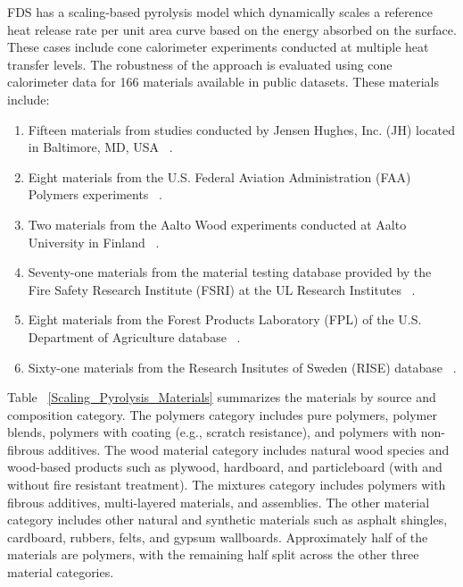 FDS has a scaling-based pyrolysis model which dynamically scales a reference heat release rate per unit area curve based on the energy absorbed on the surface.
These cases include cone calorimeter experiments conducted at multiple heat transfer levels.
The robustness of the approach is evaluated using cone calorimeter data for 166 materials available in public datasets.
These materials include:
\begin{enumerate}
\item Fifteen materials from studies conducted by Jensen Hughes, Inc. (JH) located in Baltimore, MD, USA ~\cite{Luo:FRA2019,Lattimer:NIJ19}.
\item Eight materials from the U.S. Federal Aviation Administration (FAA) Polymers experiments ~\cite{Stoliarov:CF2009,Stoliarov:FM2012}.
\item Two materials from the Aalto Wood experiments conducted at Aalto University in Finland ~\cite{Rinta-Paavola:2023}.
\item Seventy-one materials from the material testing database provided by the Fire Safety Research Institute (FSRI) at the UL Research Institutes ~\cite{McKinnon:FSRI2023_Data}.
\item Eight materials from the Forest Products Laboratory (FPL) of the U.S. Department of Agriculture database ~\cite{FPL:Fire_Database}.
\item Sixty-one materials from the Research Insitutes of Sweden (RISE) database ~\cite{RISE:Fire_Database}.
\end{enumerate}
Table ~\ref{Scaling_Pyrolysis_Materials} summarizes the materials by source and composition category.
The polymers category includes pure polymers, polymer blends, polymers with coating (e.g., scratch resistance), and polymers with non-fibrous additives.
The wood material category includes natural wood species and wood-based products such as plywood, hardboard, and particleboard (with and without fire resistant treatment).
The mixtures category includes polymers with fibrous additives, multi-layered materials, and assemblies.
The other material category includes other natural and synthetic materials such as asphalt shingles, cardboard, rubbers, felts, and gypsum wallboards.
Approximately half of the materials are polymers, with the remaining half split across the other three material categories.


